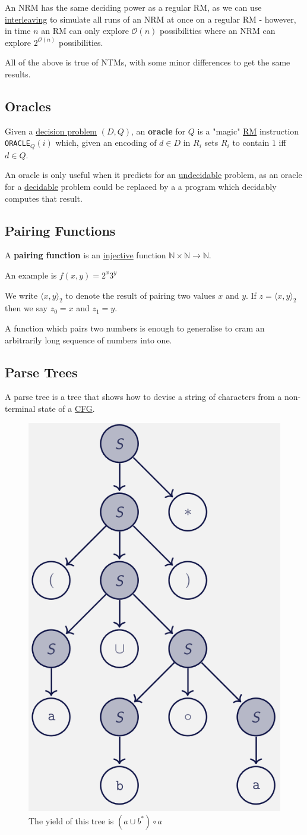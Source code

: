 \documentclass{article}
\begin{document}
An NRM has the same deciding power as a regular RM, as we can use \hyperref[interleaving]{interleaving} to simulate all runs of an NRM at once on a regular RM - however, in time $n$ an RM can only explore $\mathcal{O}(n)$ possibilities where an NRM can explore $2^{\mathcal{O}(n)}$ possibilities.

All of the above is true of NTMs, with some minor differences to get the same results.


\subsection{Oracles}\label{oracle}
Given a \hyperref[decision-problem]{decision problem} $(D, Q)$, an \textbf{oracle} for $Q$ is a "magic" \hyperref[rm]{RM} instruction \texttt{ORACLE}$_Q(i)$ which, given an encoding of $d \in D$ in $R_i$ sets $R_i$ to contain $1$ iff $d \in Q$.

An oracle is only useful when it predicts for an \hyperref[undecidable]{undecidable} problem, as an oracle for a \hyperref[decidable]{decidable} problem could be replaced by a a program which decidably computes that result.


\subsection{Pairing Functions}\label{pairing-function}
A \textbf{pairing function} is an \hyperref[injective]{injective} function $\mathbb{N} \times \mathbb{N} \to \mathbb{N}$.

An example is $f(x, y) = 2^x3^y$

We write $\langle x, y \rangle_2$ to denote the result of pairing two values $x$ and $y$. If $z = \langle x, y \rangle_2$ then we say $z_0 = x$ and $z_1 = y$.

A function which pairs two numbers is enough to generalise to cram an arbitrarily long sequence of numbers into one.


\subsection{Parse Trees}\label{parse-trees}
A parse tree is a tree that shows how to devise a string of characters from a non-terminal state of a \hyperref[cfg]{CFG}.

\begin{figure}[H]
    \centering
    \includegraphics[width=0.35\linewidth]{images/parse-tree.png}
    \caption{The yield of this tree is $(a \cup b^*) \circ a$}
\end{figure}
\end{document}
